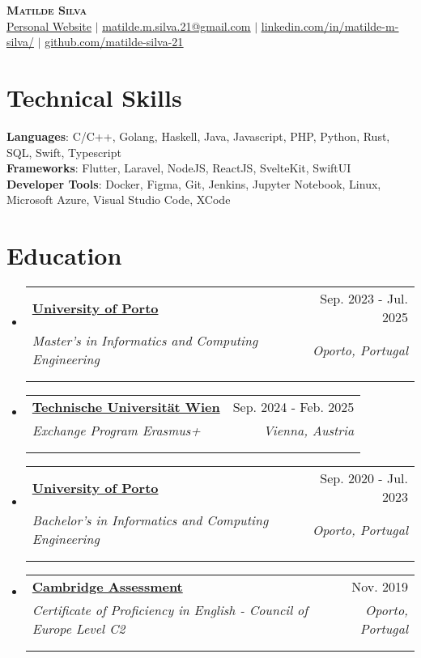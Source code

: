 \documentclass[a4paper,11pt]{article}
\makeatletter
\newcommand{\resumeSubheading}[5]{
  \vspace{-2pt}\item
    \begin{tabular*}{0.97\textwidth}[t]{l@{\extracolsep{\fill}}r}
      \textbf{#1} & #2 \\
      \textit{\small#3} & \textit{\small #4} \\
      \if\relax\detokenize{#5}\relax
      \else
        \multicolumn{2}{@{}l}{\textit{\small#5}} \\
      \fi
    \end{tabular*}\vspace{-7pt}
}
\newcommand{\resumeSubHeadingListStart}{\begin{itemize}[leftmargin=0.15in, label={}]}
\newcommand{\resumeSubHeadingListEnd}{\end{itemize}}
\makeatother
\begin{document}

\begin{center}
    \textbf{\Huge \scshape Matilde Silva} \\ \vspace{10pt}
    \small \href{https://matilde-silva-21.github.io/}{\uline{Personal Website}} $|$ \href{mailto:x@x.com}{\uline{matilde.m.silva.21@gmail.com}} $|$ 
    \href{https://www.linkedin.com/in/matilde-m-silva/}{\uline{linkedin.com/in/matilde-m-silva/}} $|$
    \href{https://github.com/matilde-silva-21}{\uline{github.com/matilde-silva-21}}
\end{center}


\section{Technical Skills}
 \begin{itemize}[leftmargin=0.15in, label={}]
    \small{\item{
     \textbf{Languages}{: C/C++, Golang, Haskell, Java, Javascript, PHP, Python, Rust, SQL, Swift, Typescript} \\
     \textbf{Frameworks}{: Flutter, Laravel, NodeJS, ReactJS, SvelteKit, SwiftUI} \\
     \textbf{Developer Tools}{: Docker, Figma, Git, Jenkins, Jupyter Notebook, Linux, Microsoft Azure, Visual Studio Code, XCode}
    }}
 \end{itemize}

\section{Education}
  \resumeSubHeadingListStart
      \resumeSubheading
      {\href{https://sigarra.up.pt/feup/en/WEB_PAGE.INICIAL}{University of Porto}}{Sep. 2023 - Jul. 2025}
      {Master’s in Informatics and Computing Engineering}{Oporto, Portugal}
      {Current Grade: 16/20}
    \resumeSubheading
      {\href{https://informatics.tuwien.ac.at/}{Technische Universität Wien}}{Sep. 2024 - Feb. 2025}
      {Exchange Program Erasmus+}{Vienna, Austria}
      {}
    \resumeSubheading
      {\href{https://sigarra.up.pt/feup/en/WEB_PAGE.INICIAL}{University of Porto}}{Sep. 2020 - Jul. 2023}
      {Bachelor’s in Informatics and Computing Engineering}{Oporto, Portugal}
      {Final Grade: 15/20}
	\resumeSubheading
      {\href{https://www.cambridgeenglish.org/}{Cambridge Assessment}}{Nov. 2019}
      {Certificate of Proficiency in English - Council of Europe Level C2}{Oporto, Portugal}
      {Final Grade: 218/230}
  \resumeSubHeadingListEnd
\leavevmode \\ %
\end{document}
